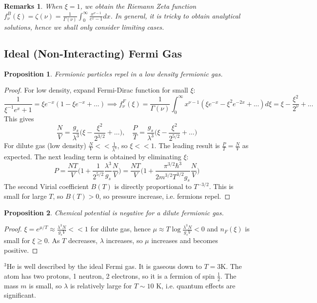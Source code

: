 \documentclass[a4paper]{article}
\newtheorem{remarks}{Remarks}[section]
\theoremstyle{new}
\newtheorem{prop}{Proposition}[section]
\begin{document}
\begin{remarks}
When $\xi=1$, we obtain the Riemann Zeta function $f_\nu^B(\xi)=\zeta(\nu)=\frac{1}{\Gamma(\nu)}\int_0^\infty\frac{x^{\nu-1}}{e^x-1}dx$. In general, it is tricky to obtain analytical solutions, hence we shall only consider limiting cases.
\end{remarks}
\subsection{Ideal (Non-Interacting) Fermi Gas}
\begin{prop}
Fermionic particles repel in a low density fermionic gas.
\end{prop}
\begin{proof}
For low density, expand Fermi-Dirac function for small $\xi$:
$$\frac{1}{\xi^{-1}e^x+1}=\xi e^{-x}(1-\xi e^{-x}+...)\implies f_\nu^F(\xi)=\frac{1}{\Gamma(\nu)}\int_0^\infty x^{\nu-1}(\xi e^{-x}-\xi^2e^{-2x}+...)d\xi=\xi-\frac{\xi^2}{2^\nu}+...$$
This gives
$$\frac{N}{V}=\frac{g_s}{\lambda^3}\bigg(\xi-\frac{\xi^2}{2^{3/2}}+\dots\bigg),\quad\frac{P}{T}=\frac{g_s}{\lambda^3}\bigg(\xi-\frac{\xi^2}{2^{5/2}}+\dots\bigg)$$
For dilute gas (low density) $\frac{N}{V}<<\frac{1}{\lambda^3}$, so $\xi<<1$. The leading result is $\frac{P}{T}=\frac{N}{V}$ as expected. The next leading term is obtained by eliminating $\xi$:
$$P=\frac{NT}{V}\bigg(1+\frac{1}{2^{5/2}}\frac{\lambda^3}{g_s}\frac{N}{V}\bigg)=\frac{NT}{V}\bigg(1+\frac{\pi^{3/2}\hbar^3}{2m^{3/2}T^{3/2}g_s}\frac{N}{V}\bigg)$$
The second Virial coefficient $B(T)$ is directly proportional to $T^{-3/2}$. This is small for large $T$, so $B(T)>0$, so pressure increase, i.e. fermions repel.
\end{proof}
\begin{prop}
Chemical potential is negative for a dilute fermionic gas.
\end{prop}
\begin{proof}
$\xi=e^{\mu/T}\approx\frac{\lambda^3N}{g_sV}<<1$ for dilute gas, hence $\mu\approx T\log\frac{\lambda^3N}{g_sV}<0$ and $n_F(\xi)$ is small for $\xi\geq0$. As $T$ decreases, $\lambda$ increases, so $\mu$ increases and becomes positive. 
\end{proof}
$^3$He is well described by the ideal Fermi gas. It is gaseous down to $T=3$K. The atom has two protons, 1 neutron, 2 electrons, so it is a fermion of spin $\frac{1}{2}$. The mass $m$ is small, so $\lambda$ is relatively large for $T\sim 10$ K, i.e. quantum effects are significant.
\end{document}
